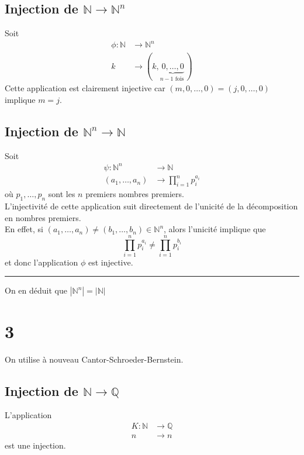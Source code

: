 \documentclass[11pt, a4paper, twoside]{article}
\newcommand\hr{
    \noindent\rule[0.5ex]{\linewidth}{0.5pt}\newline
}
\begin{document}
\subsection*{ Injection de $\mathbb{N} \to \mathbb{N}^{n}$}
Soit 
 \begin{align*}
	 \phi: \mathbb{N} &\to \mathbb{N}^{n}\\ 
	 k &\to (k, \underbrace{0, \ldots, 0}_{n-1 \text{ fois } })
\end{align*}
Cette application est clairement injective car $ ( m, 0, \ldots, 0) = (j, 0, \ldots, 0)$ implique $m=j$.
\subsection*{Injection de $ \mathbb{N}^{n} \to \mathbb{N}$}
Soit
\begin{align*}
	\psi: \mathbb{N}^{n} &\to \mathbb{N}\\
	( a_1, \ldots, a_n) & \to \prod_{i=1} ^{n} p_{i} ^{a_i}
\end{align*}
où $ p_1, \ldots, p_n$ sont les $n$ premiers nombres premiers.\\
L'injectivité de cette application suit directement de l'unicité de la décomposition en nombres premiers.\\
En effet, si $ (a_1, \ldots, a_n) \neq ( b_1, \ldots ,b_n) \in \mathbb{N}^{n}$, alors l'unicité implique que
\[ 
\prod_{i=1} ^{n} p_i^{a_i} \neq \prod_{i=1} ^{n}p_i^{b_i}
\]
et donc l'application $\phi$ est injective.\\
\hr
On en déduit que $ |\mathbb{N}^{n}| = | \mathbb{N}|$
\section*{3}
On utilise à nouveau Cantor-Schroeder-Bernstein.\\
\subsection*{Injection de $\mathbb{N} \to \mathbb{Q}$}
L'application
\begin{align*}
	K: \mathbb{N} &\to \mathbb{Q}\\
	 n &\to n
\end{align*}
est une injection.\\
\end{document}
